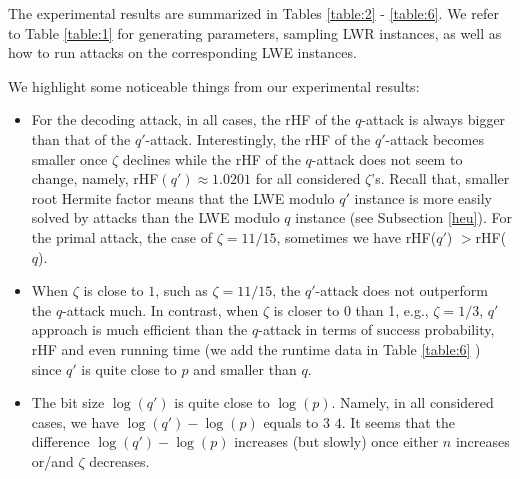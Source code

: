 \documentclass{cta-author}
\begin{document}


The experimental results are summarized in Tables \ref{table:2} - \ref{table:6}.  We refer to Table \ref{table:1} for generating parameters, sampling LWR instances, as well as how to run attacks on the corresponding LWE instances.

We highlight some noticeable things from our experimental results:
\begin{itemize}
	\item For the decoding attack, in all cases, the rHF of the $q$-attack is always bigger than that of the $q'$-attack. Interestingly, the rHF of the $q'$-attack becomes smaller once $\zeta$ declines while the rHF of the $q$-attack does not seem to change, namely, rHF$(q') \approx 1.0201$ for all considered $\zeta$'s. Recall that, smaller root Hermite factor means that the LWE modulo $q'$ instance is more easily solved by attacks than the LWE modulo $q$ instance (see Subsection \ref{heu}). For the primal attack, the case of $\zeta=11/15$, sometimes we have  rHF($q'$) $>$rHF($q$).
	\item When $\zeta$ is close to $1$, such as $\zeta=11/15$, the $q'$-attack does not outperform the $q$-attack much. In contrast, when $\zeta$ is closer to 0 than 1, e.g., $\zeta=1/3$,  $q'$ approach is much efficient than the $q$-attack in terms of success probability, rHF and even running time (we add the runtime data in Table \ref{table:6} ) since $q'$ is quite close to $p$ and smaller than $q$.
	\item The bit size $\log(q')$ is quite close to $\log(p)$. Namely, in all considered cases, we have $\log(q')-\log(p)$ equals to $3$  $4$. It seems that the difference $\log(q')-\log(p)$ increases (but slowly) once either $n$ increases or/and $\zeta$ decreases.  
	
\end{itemize}
\end{document}
